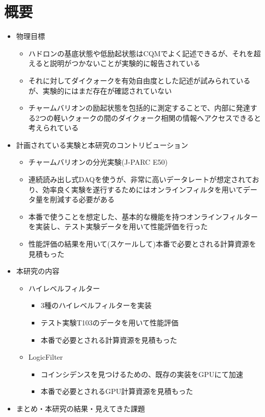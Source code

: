 \documentclass[../main.tex]{subfiles}
\begin{document}
\section*{\centering 概要}
\begin{tcolorbox}[
  title=draft abstract,
  colback=yellow!8,
  colframe=black!30,
  breakable
]
\begin{itemize}
  \item 物理目標
  \begin{itemize}
    \item ハドロンの基底状態や低励起状態はCQMでよく記述できるが、それを超えると説明がつかないことが実験的に報告されている
    \item それに対してダイクォークを有効自由度とした記述が試みられているが、実験的にはまだ存在が確認されていない
    \item チャームバリオンの励起状態を包括的に測定することで、内部に発達する2つの軽いクォークの間のダイクォーク相関の情報へアクセスできると考えられている
  \end{itemize}
  \item 計画されている実験と本研究のコントリビューション
  \begin{itemize}
    \item チャームバリオンの分光実験(J-PARC E50)
    \item 連続読み出し式DAQを使うが、非常に高いデータレートが想定されており、効率良く実験を遂行するためにはオンラインフィルタを用いてデータ量を削減する必要がある
    \item 本番で使うことを想定した、基本的な機能を持つオンラインフィルターを実装し、テスト実験データを用いて性能評価を行った
    \item 性能評価の結果を用いて(スケールして)本番で必要とされる計算資源を見積もった
  \end{itemize}
  \item 本研究の内容
  \begin{itemize}
    \item ハイレベルフィルター
    \begin{itemize}
      \item 3種のハイレベルフィルターを実装
      \item テスト実験T103のデータを用いて性能評価
      \item 本番で必要とされる計算資源を見積もった
    \end{itemize}
    \item LogicFilter
    \begin{itemize}
      \item コインシデンスを見つけるための、既存の実装をGPUにて加速
      \item 本番で必要とされるGPU計算資源を見積もった
    \end{itemize}
  \end{itemize}
  \item まとめ・本研究の結果・見えてきた課題
\end{itemize}
\end{tcolorbox}
\end{document}
